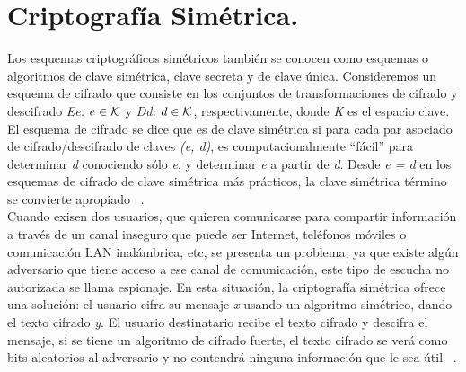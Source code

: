 
\section{Criptografía Simétrica. }
Los esquemas criptográficos simétricos también se conocen como esquemas o algoritmos de clave simétrica, clave secreta y de clave única. Consideremos un esquema de cifrado que consiste en los conjuntos de transformaciones de cifrado y descifrado \textit{Ee: $e \in {\cal K}$} y \textit{Dd: $d \in {\cal K}$}, respectivamente, donde \textit{K} es el espacio clave. El esquema de cifrado se dice que es de clave simétrica si para cada par asociado de cifrado/descifrado de claves \textit{(e, d)}, es computacionalmente “fácil” para determinar \textit{d} conociendo sólo \textit{e}, y determinar \textit{e} a partir de \textit{d}. Desde\textit{ e = d} en los esquemas de cifrado de clave simétrica más prácticos, la clave simétrica término se convierte apropiado ~\cite{menezes}.
\\
Cuando exisen dos usuarios, que quieren comunicarse para compartir información a través de un canal inseguro que puede ser Internet, teléfonos móviles o comunicación LAN inalámbrica, etc, se presenta un problema, ya que existe algún adversario que tiene acceso a ese canal de comunicación, este tipo de escucha no autorizada se llama espionaje. En esta situación, la criptografía simétrica ofrece una solución: el usuario cifra su mensaje \textit{x} usando un algoritmo simétrico, dando el texto cifrado \textit{y}. El usuario destinatario recibe el texto cifrado y descifra el mensaje, si se tiene un algoritmo de cifrado fuerte, el texto cifrado se verá como bits aleatorios al adversario y no contendrá ninguna información que le sea útil ~\cite{paar}.



